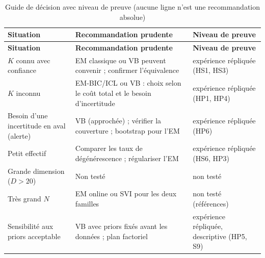{\scriptsize
\setlength{\tabcolsep}{3pt}
\begin{longtable}{>{\raggedright\arraybackslash}p{4.30cm}>{\raggedright\arraybackslash}p{7.20cm}>{\raggedright\arraybackslash}p{3.80cm}}
\caption{Guide de décision avec niveau de preuve (aucune ligne n'est une recommandation absolue)}\label{tab:3_4}\\
\toprule
\textbf{Situation} & \textbf{Recommandation prudente} & \textbf{Niveau de preuve} \\
\midrule
\endfirsthead
\toprule
\textbf{Situation} & \textbf{Recommandation prudente} & \textbf{Niveau de preuve} \\
\midrule
\endhead
\bottomrule
\endfoot
$K$ connu avec confiance & EM classique ou VB peuvent convenir ; confirmer l'équivalence & expérience répliquée (HS1, HS3) \\
$K$ inconnu & EM-BIC/ICL ou VB : choix selon le coût total et le besoin d'incertitude & expérience répliquée (HP1, HP4) \\
Besoin d'une incertitude en aval (alerte) & VB (approchée) ; vérifier la couverture ; bootstrap pour l'EM & expérience répliquée (HP6) \\
Petit effectif & Comparer les taux de dégénérescence ; régulariser l'EM & expérience répliquée (HS6, HP3) \\
Grande dimension ($D>20$) & Non testé & non testé \\
Très grand $N$ & EM online ou SVI pour les deux familles & non testé (références) \\
Sensibilité aux priors acceptable & VB avec priors fixés avant les données ; plan factoriel & expérience répliquée, descriptive (HP5, S9) \\
\end{longtable}
}
